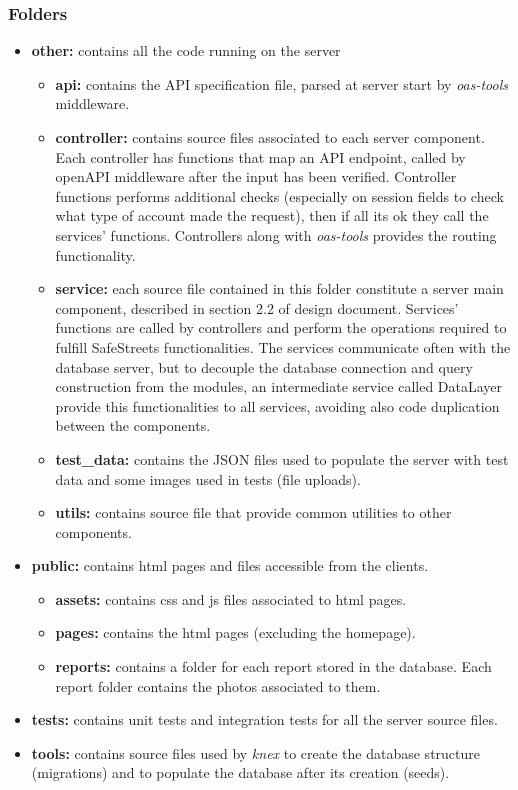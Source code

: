 \subsubsection{Folders}
\begin{itemize}
	\item \textbf{other:} contains all the code running on the server
	\begin{itemize}
		\item \textbf{api:} contains the API specification file, parsed at server start by \textit{oas-tools} middleware.
		\item \textbf{controller:} contains source files associated to each server component. Each controller has functions that map an API endpoint, called by openAPI middleware after the input has been verified. Controller functions performs additional checks (especially on session fields to check what type of account made the request), then if all its ok they call the services' functions. Controllers along with \textit{oas-tools} provides the routing functionality.
		\item \textbf{service:} each source file contained in this folder constitute a server main component, described in section 2.2 of design document. Services' functions are called by controllers and perform the operations required to fulfill SafeStreets functionalities. The services communicate often with the database server, but to decouple the database connection and query construction from the modules, an intermediate service called DataLayer provide this functionalities to all services, avoiding also code duplication between the components.
		\item \textbf{test\_data:} contains the JSON files used to populate the server with test data and some images used in tests (file uploads).
		\item \textbf{utils:} contains source file that provide common utilities to other components.
	\end{itemize} 

	\item \textbf{public:} contains html pages and files accessible from the clients.
	\begin{itemize}
		\item \textbf{assets:} contains css and js files associated to html pages.
		\item \textbf{pages:} contains the html pages (excluding the homepage).
		\item \textbf{reports:} contains a folder for each report stored in the database. Each report folder contains the photos associated to them.
	\end{itemize}

	\item \textbf{tests:} contains unit tests and integration tests for all the server source files.
	\item \textbf{tools:} contains source files used by \textit{knex} to create the database structure (migrations) and to populate the database after its creation (seeds).
\end{itemize}